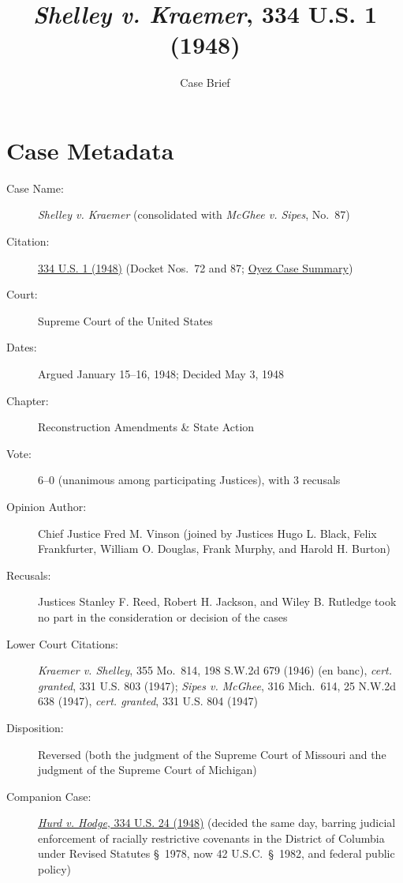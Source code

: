 \documentclass[12pt]{article}
\title{\textit{Shelley v. Kraemer}, 334 U.S. 1 (1948)}
\author{Case Brief}
\date{}
\begin{document}
\maketitle


\section{Case Metadata}

\begin{description}
    \item[Case Name:] \textit{Shelley v. Kraemer} (consolidated with \textit{McGhee v. Sipes}, No.~87)
    \item[Citation:] \href{https://supreme.justia.com/cases/federal/us/334/1/}{334 U.S. 1 (1948)} (Docket Nos.~72 and 87; \href{https://www.oyez.org/cases/1940-1955/334us1}{Oyez Case Summary})
    \item[Court:] Supreme Court of the United States
    \item[Dates:] Argued January 15--16, 1948; Decided May 3, 1948
    \item[Chapter:] Reconstruction Amendments \& State Action
    \item[Vote:] 6--0 (unanimous among participating Justices), with 3 recusals
    \item[Opinion Author:] Chief Justice Fred M. Vinson (joined by Justices Hugo L. Black, Felix Frankfurter, William O. Douglas, Frank Murphy, and Harold H. Burton)
    \item[Recusals:] Justices Stanley F. Reed, Robert H. Jackson, and Wiley B. Rutledge took no part in the consideration or decision of the cases
    \item[Lower Court Citations:] \textit{Kraemer v. Shelley}, 355 Mo.~814, 198 S.W.2d 679 (1946) (en banc), \textit{cert. granted}, 331 U.S. 803 (1947); \textit{Sipes v. McGhee}, 316 Mich.~614, 25 N.W.2d 638 (1947), \textit{cert. granted}, 331 U.S. 804 (1947)
    \item[Disposition:] Reversed (both the judgment of the Supreme Court of Missouri and the judgment of the Supreme Court of Michigan)
    \item[Companion Case:] \href{https://supreme.justia.com/cases/federal/us/334/24/}{\textit{Hurd v. Hodge}, 334 U.S. 24 (1948)} (decided the same day, barring judicial enforcement of racially restrictive covenants in the District of Columbia under Revised Statutes \S~1978, now 42 U.S.C.~\S~1982, and federal public policy)
\end{description}
\end{document}
